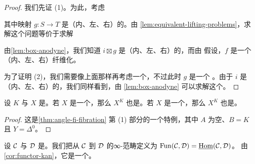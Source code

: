 \begin{proof}
我们先证 (1)。为此，考虑\trLiftingProblem{}%
\begin{center}
\end{center}
其中映射 $g\colon S \to T$ 是（内、左、右）\trAnodyne{}的。由%
\cref{lem:equivalent-lifting-problems}，求解这个问题等价于求解\trLiftingProblem{}%
\begin{center}
\end{center}
由\cref{lem:box-anodyne}，我们知道 $i \boxtimes g$ 是（内、左、右）\trAnodyne{}的，而由
假设，$f$ 是一个（内、左、右）纤维化。

为了证明 (2)，我们需要像上面那样再考虑一个\trLiftingProblem{}，不过此时 $g$ 是一个%
\trMonomorphism{}。由于 $i$ 是（内、左、右）\trAnodyne{}的，我们同样看到，由%
\cref{lem:box-anodyne} 可以求解这个\trLiftingProblem{}。
\end{proof}

\begin{corollary}\label{cor:functor-kan}
设 $K$ 与 $X$ 是\trSimplicialSet{}。若 $X$ 是一个\trInfinityCategory{}，那么 $X^K$ 也是。若
$X$ 是一个\trKanComplex{}，那么 $X^K$ 也是。
\end{corollary}

\begin{proof}
这是\cref{thm:angle-fi-fibration} 第 (1) 部分的一个特例，其中 $A$ 为空、$B = K$
且 $Y = \Delta^0$。
\end{proof}

\begin{definition}\label{def:functor-infinity-category}
设 $\mathcal{C}$ 与 $\mathcal{D}$ 是\trInfinityCategories{}。我们把从 $\mathcal{C}$ 到
$\mathcal{D}$ 的\trFunctor{}∞-范畴定义为
$\mathrm{Fun}(\mathcal{C}, \mathcal{D}) = \underline{\mathrm{Hom}}(\mathcal{C}, \mathcal{D})$。
由\cref{cor:functor-kan}，它是一个\trInfinityCategory{}。
\end{definition}


